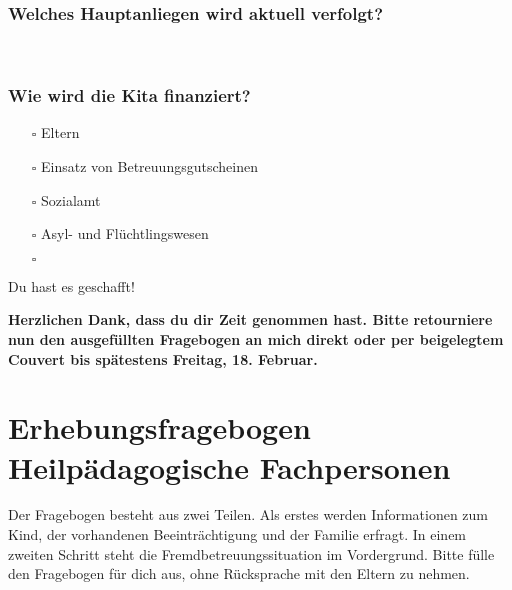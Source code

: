 \documentclass[
  ngerman,
  11pt,
  paper=a4,
  twoside,
  titlepage=true,
  openright,
  abstract=on,
  toc=listofnumbered,
  numbers=noenddot,
  chapterprefix=true,
  headings=optiontohead,
  svgnames,
  dvipsnames]{scrreprt}
\providecommand{\tightlist}{%
  \setlength{\itemsep}{0pt}\setlength{\parskip}{0pt}}
\begin{document}
\xhrule[,fill=1.0000\textwidth,thickness=0.5pt]\\
\xhrule[,fill=1.0000\textwidth,thickness=0.5pt]\\
\xhrule[,fill=1.0000\textwidth,thickness=0.5pt]\\
\xhrule[,fill=1.0000\textwidth,thickness=0.5pt]\\
\xhrule[,fill=1.0000\textwidth,thickness=0.5pt]

\hypertarget{welches-hauptanliegen-wird-aktuell-verfolgt}{%
\subsection*{Welches Hauptanliegen wird aktuell
verfolgt?}\label{welches-hauptanliegen-wird-aktuell-verfolgt}}

\xhrule[,fill=1.0000\textwidth,thickness=0.5pt]\\
\xhrule[,fill=1.0000\textwidth,thickness=0.5pt]

\hypertarget{wie-wird-die-kita-finanziert}{%
\subsection*{Wie wird die Kita
finanziert?}\label{wie-wird-die-kita-finanziert}}

\begin{itemize}
\tightlist
\item[$\square$]
  Eltern
\item[$\square$]
  Einsatz von Betreuungsgutscheinen
\item[$\square$]
  Sozialamt
\item[$\square$]
  Asyl- und Flüchtlingswesen
\item[$\square$]
  \xhrule[,fill=8cm,thickness=0.5pt]
\end{itemize}

Du hast es geschafft!

\textbf{Herzlichen Dank, dass du dir Zeit genommen hast. Bitte
retourniere nun den ausgefüllten Fragebogen an mich direkt oder per
beigelegtem Couvert bis spätestens Freitag, 18. Februar.}

\hypertarget{sec:erhebungsfragebogenallgemein}{%
\chapter{Erhebungsfragebogen Heilpädagogische
Fachpersonen}\label{sec:erhebungsfragebogenallgemein}}

Der Fragebogen besteht aus zwei Teilen. Als erstes werden Informationen
zum Kind, der vorhandenen Beeinträchtigung und der Familie erfragt. In
einem zweiten Schritt steht die Fremdbetreuungssituation im Vordergrund.
Bitte fülle den Fragebogen für dich aus, ohne Rücksprache mit den Eltern
zu nehmen.
\end{document}
